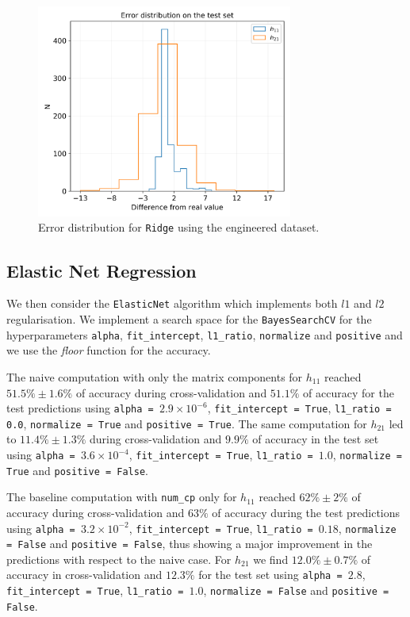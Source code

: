     \begin{figure}[t]
        \centering
        \includegraphics[width=0.75\textwidth]{tex/img/ridge_error_eng.png}
        \caption{Error distribution for \texttt{Ridge} using the engineered dataset.}
        \label{fig:ridge_err}
    \end{figure}
    
\subsection{Elastic Net Regression}
    We then consider the \texttt{ElasticNet} algorithm which implements both $l1$ and $l2$ regularisation. We implement a search space for the \texttt{BayesSearchCV} for the hyperparameters \texttt{alpha}, \texttt{fit\_intercept}, \texttt{l1\_ratio}, \texttt{normalize} and \texttt{positive} and we use the \textit{floor} function for the accuracy.
    
    The naive computation with only the matrix components for $h_{11}$ reached $51.5\% \pm 1.6\%$ of accuracy during cross-validation and $51.1\%$ of accuracy for the test predictions using \texttt{alpha = $2.9 \times 10^{-6}$}, \texttt{fit\_intercept = True}, \texttt{l1\_ratio = 0.0}, \texttt{normalize = True} and \texttt{positive = True}. The same computation for $h_{21}$ led to $11.4\% \pm 1.3\%$ during cross-validation and $9.9\%$ of accuracy in the test set using \texttt{alpha = $3.6 \times 10^{-4}$}, \texttt{fit\_intercept = True}, \texttt{l1\_ratio = $1.0$}, \texttt{normalize = True} and \texttt{positive = False}.
    
    The baseline computation with \texttt{num\_cp} only for $h_{11}$ reached $62\% \pm 2\%$ of accuracy during cross-validation and $63\%$ of accuracy during the test predictions using \texttt{alpha = $3.2 \times 10^{-2}$}, \texttt{fit\_intercept = True}, \texttt{l1\_ratio = $0.18$}, \texttt{normalize = False} and \texttt{positive = False}, thus showing a major improvement in the predictions with respect to the naive case. For $h_{21}$ we find $12.0\% \pm 0.7\%$ of accuracy in cross-validation and $12.3\%$ for the test set using \texttt{alpha = $2.8$}, \texttt{fit\_intercept = True}, \texttt{l1\_ratio = $1.0$}, \texttt{normalize = False} and \texttt{positive = False}.
    
